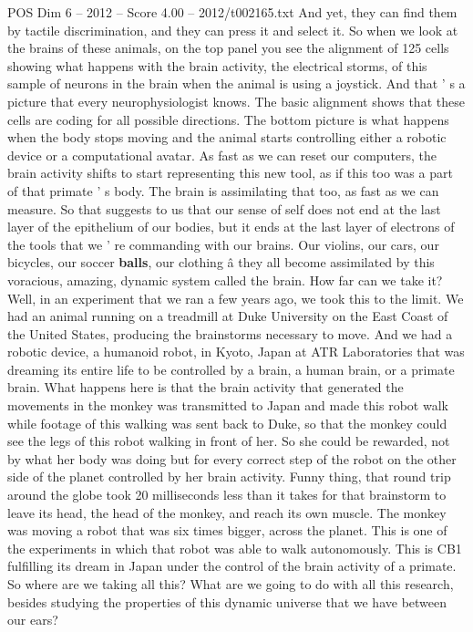 \begin{textsample}{POS Dim 6 – 2012 – Score 4.00 – 2012/t002165.txt}
And yet, they can find them by tactile discrimination, and they can press it and select it.
So when we look at the brains of these animals, on the top panel you see the alignment of 125 cells showing what happens with the brain activity, the electrical storms, of this sample of neurons in the brain when the animal is using a joystick.
And that ' s a picture that every neurophysiologist knows.
The basic alignment shows that these cells are coding for all possible directions.
The bottom picture is what happens when the body stops moving and the animal starts controlling either a robotic device or a computational avatar.
As fast as we can reset our computers, the brain activity shifts to start representing this new tool, as if this too was a part of that primate ' s body.
The brain is assimilating that too, as fast as we can measure.
So that suggests to us that our sense of self does not end at the last layer of the epithelium of our bodies, but it ends at the last layer of electrons of the tools that we ' re commanding with our brains.
Our violins, our cars, our bicycles, our soccer \textbf{balls}, our clothing â they all become assimilated by this voracious, amazing, dynamic system called the brain.
How far can we take it?
Well, in an experiment that we ran a few years ago, we took this to the limit.
We had an animal running on a treadmill at Duke University on the East Coast of the United States, producing the brainstorms necessary to move.
And we had a robotic device, a humanoid robot, in Kyoto, Japan at ATR Laboratories that was dreaming its entire life to be controlled by a brain, a human brain, or a primate brain.
What happens here is that the brain activity that generated the movements in the monkey was transmitted to Japan and made this robot walk while footage of this walking was sent back to Duke, so that the monkey could see the legs of this robot walking in front of her.
So she could be rewarded, not by what her body was doing but for every correct step of the robot on the other side of the planet controlled by her brain activity.
Funny thing, that round trip around the globe took 20 milliseconds less than it takes for that brainstorm to leave its head, the head of the monkey, and reach its own muscle.
The monkey was moving a robot that was six times bigger, across the planet.
This is one of the experiments in which that robot was able to walk autonomously.
This is CB1 fulfilling its dream in Japan under the control of the brain activity of a primate.
So where are we taking all this?
What are we going to do with all this research, besides studying the properties of this dynamic universe that we have between our ears?

\end{textsample}
